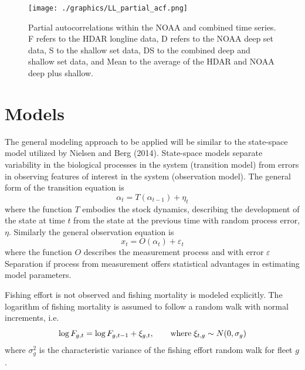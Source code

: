 \documentclass[12pt,letterpaper]{article}
\begin{document}
\begin{figure}
\begin{center}
\texttt{[image: ./graphics/LL\_partial\_acf.png]}
\caption{\label{fig:LLpartialacf}
Partial autocorrelations within the NOAA and combined time
series. F refers to the HDAR longline data, D refers to the NOAA deep
set data, S to the shallow set data,
DS to the combined deep and shallow set data, and Mean to the average
of the HDAR and NOAA deep plus shallow.
}
\end{center}
\end{figure}


\clearpage
\section*{Models}
The general modeling approach to be applied will be similar to the
state-space model utilized by Nielsen and Berg (2014). 
State-space models separate variability in the biological
processes in the system (transition model)
from errors in observing features of interest
in the system (observation model). 
The general form of the transition equation is
\begin{equation}
\alpha_t=T(\alpha_{t-1}) + \eta_t
\end{equation}
where the function $T$ embodies the stock dynamics, describing the
development of the state at time $t$ from the state at the previous
time with random process error, $\eta$.
Similarly the general observation equation is
\begin{equation}
x_t = O(\alpha_t) + \varepsilon_t
\end{equation}
where the function $O$ describes the measurement process and with
error $\varepsilon$
Separation if process from measurement offers statistical advantages in
estimating model parameters.

Fishing effort is not observed and fishing mortality is
modeled explicitly. The logarithm of fishing mortality is assumed to
follow a random walk with normal increments, i.e.
\begin{equation}
\log F_{g,t} = \log F_{g,t-1} + \xi_{g,t},\qquad {\rm where}\;
\xi_{t,g}\sim N(0,\sigma_g)
\label{eqn:Fwalk}
\end{equation}
where  $\sigma^2_g$ is the characteristic variance of the fishing
effort random walk for fleet $g$.
\end{document}
